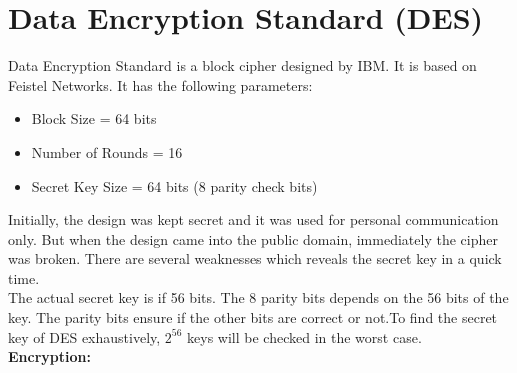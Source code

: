 \documentclass[11pt]{article}
\begin{document}
\section{Data Encryption Standard (DES)}
Data Encryption Standard is a block cipher designed by IBM. It is based on Feistel Networks. It has the following parameters:
\begin{itemize}
    \item Block Size = 64 bits
    \item Number of Rounds = 16
    \item Secret Key Size = 64 bits (8 parity check bits)
\end{itemize}
Initially, the design was kept secret and it was used for personal communication only. But when the design came into the public domain, immediately the cipher was broken. There are several weaknesses which reveals the secret key in a quick time.\\
\newline 
The actual secret key is if 56 bits. The 8 parity bits depends on the 56 bits of the key. The parity bits ensure if the other bits are correct or not.To find the secret key of DES exhaustively, $2^{56}$ keys will be checked in the worst case.\\
\newline
\textbf{Encryption: }
\end{document}
